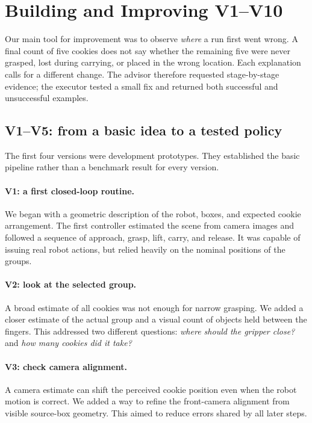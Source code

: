 \section{Building and Improving V1--V10}
\label{sec:development}
Our main tool for improvement was to observe \emph{where} a run first went wrong. A final count of five cookies does not say whether the remaining five were never grasped, lost during carrying, or placed in the wrong location. Each explanation calls for a different change. The advisor therefore requested stage-by-stage evidence; the executor tested a small fix and returned both successful and unsuccessful examples.

\subsection{V1--V5: from a basic idea to a tested policy}
The first four versions were development prototypes. They established the basic pipeline rather than a benchmark result for every version.

\paragraph{V1: a first closed-loop routine.}
We began with a geometric description of the robot, boxes, and expected cookie arrangement. The first controller estimated the scene from camera images and followed a sequence of approach, grasp, lift, carry, and release. It was capable of issuing real robot actions, but relied heavily on the nominal positions of the groups.

\paragraph{V2: look at the selected group.}
A broad estimate of all cookies was not enough for narrow grasping. We added a closer estimate of the actual group and a visual count of objects held between the fingers. This addressed two different questions: \emph{where should the gripper close?} and \emph{how many cookies did it take?}

\paragraph{V3: check camera alignment.}
A camera estimate can shift the perceived cookie position even when the robot motion is correct. We added a way to refine the front-camera alignment from visible source-box geometry. This aimed to reduce errors shared by all later steps.

